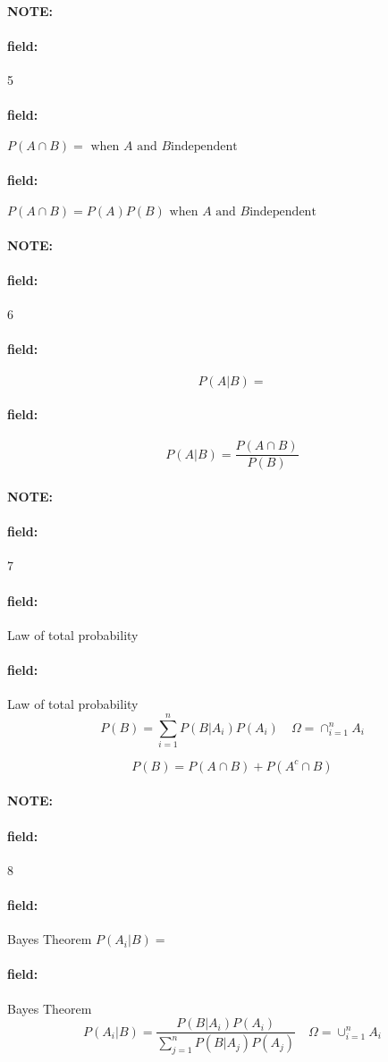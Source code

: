 \documentclass[12pt]{article}
\newenvironment{note}{\paragraph{NOTE:}}{}
\newenvironment{field}{\paragraph{field:}}{}
\begin{document}
\begin{note}
  \begin{field}
    \tiny 5
  \end{field}
  \begin{field}
    $P(A \cap B) =  \text{ when }A \text{ and } B \text{independent}$
  \end{field}
  \begin{field}
    $P(A \cap B) = P(A)P(B) \text{ when }A \text{ and } B \text{independent}$
  \end{field}
  \end{note}

\begin{note}
  \begin{field}
    \tiny 6
  \end{field}
  \begin{field}
    $$P(A|B) = $$
  \end{field}
  \begin{field}
    $$P(A|B) = \frac{P(A\cap B)}{P(B)}$$
  \end{field}
\end{note}

\begin{note}
  \begin{field}
    \tiny 7
  \end{field}
  \begin{field}
    Law of total probability
  \end{field}
  \begin{field}
    Law of total probability
    $$P(B) = \sum_{i=1}^n P(B|A_i)P(A_i) \quad \Omega = \cap_{i=1}^n A_i$$

    $$P(B) = P(A \cap B) + P(A^c \cap B) $$
   \end{field}
\end{note}

\begin{note}
  \begin{field}
    \tiny 8
  \end{field}
  \begin{field}
    Bayes Theorem $P(A_i|B) =$
  \end{field}
  \begin{field}
    Bayes Theorem
    $$P(A_i|B) = \frac{P(B|A_i)P(A_i)}{\sum_{j=1}^n P(B|A_j)P(A_j)} \quad \Omega = \cup_{i=1}^n A_i$$
  \end{field}
\end{note}
\end{document}
